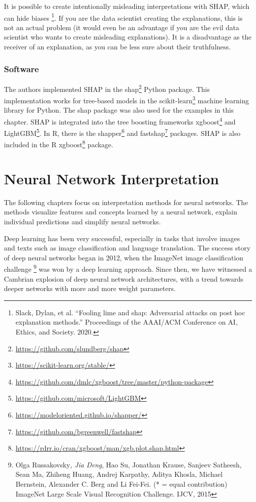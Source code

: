 \documentclass[12pt,]{krantz}
\renewcommand{\href}[2]{#2\footnote{\url{#1}}}
\begin{document}
It is possible to create intentionally misleading interpretations with
SHAP, which can hide biases \footnote{Slack, Dylan, et al. ``Fooling
  lime and shap: Adversarial attacks on post hoc explanation methods.''
  Proceedings of the AAAI/ACM Conference on AI, Ethics, and Society.
  2020.}. If you are the data scientist creating the explanations, this
is not an actual problem (it would even be an advantage if you are the
evil data scientist who wants to create misleading explanations). It is
a disadvantage as the receiver of an explanation, as you can be less
sure about their truthfulness.

\subsection{Software}\label{software-4}

The authors implemented SHAP in the
\href{https://github.com/slundberg/shap}{shap} Python package. This
implementation works for tree-based models in the
\href{https://scikit-learn.org/stable/}{scikit-learn} machine learning
library for Python. The shap package was also used for the examples in
this chapter. SHAP is integrated into the tree boosting frameworks
\href{https://github.com/dmlc/xgboost/tree/master/python-package}{xgboost}
and \href{https://github.com/microsoft/LightGBM}{LightGBM}. In R, there
is the \href{https://modeloriented.github.io/shapper/}{shapper} and
\href{https://github.com/bgreenwell/fastshap}{fastshap} packages. SHAP
is also included in the R
\href{https://rdrr.io/cran/xgboost/man/xgb.plot.shap.html}{xgboost}
package.

\chapter{Neural Network Interpretation}\label{neural-networks}

The following chapters focus on interpretation methods for neural
networks. The methods visualize features and concepts learned by a
neural network, explain individual predictions and simplify neural
networks.

Deep learning has been very successful, especially in tasks that involve
images and texts such as image classification and language translation.
The success story of deep neural networks began in 2012, when the
ImageNet image classification challenge \footnote{Olga
  Russakovsky\emph{, Jia Deng}, Hao Su, Jonathan Krause, Sanjeev
  Satheesh, Sean Ma, Zhiheng Huang, Andrej Karpathy, Aditya Khosla,
  Michael Bernstein, Alexander C. Berg and Li Fei-Fei. (* = equal
  contribution) ImageNet Large Scale Visual Recognition Challenge. IJCV,
  2015} was won by a deep learning approach. Since then, we have
witnessed a Cambrian explosion of deep neural network architectures,
with a trend towards deeper networks with more and more weight
parameters.
\end{document}
